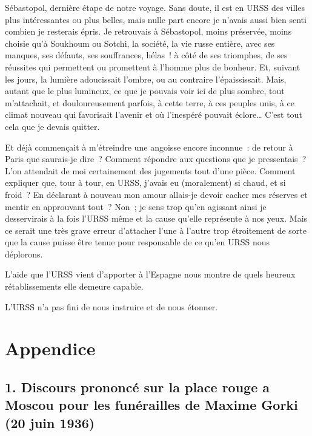 \documentclass[french,twoside]{book} %
\newcommand{\astermono}{\medskip\centerline{\color{rubric}\large\selectfont{\syms ✻}}\medskip\par}%
\newcommand\chapteropen{} %
\newcommand\chaptercont{} %
\newcommand\chapterclose{} %
\begin{document}
\chaptercont
\noindent Sébastopol, dernière étape de notre voyage. Sans doute, il est en URSS des villes plus intéressantes ou plus belles, mais nulle part encore je n’avais aussi bien senti combien je resterais épris. Je retrouvais à Sébastopol, moins préservée, moins choisie qu’à Soukhoum ou Sotchi, la société, la vie russe entière, avec ses manques, ses défauts, ses souffrances, hélas ! à côté de ses triomphes, de ses réussites qui permettent ou promettent à l’homme plus de bonheur. Et, suivant les jours, la lumière adoucissait l’ombre, ou au contraire l’épaississait. Mais, autant que le plus lumineux, ce que je pouvais voir ici de plus sombre, tout m’attachait, et douloureusement parfois, à cette terre, à ces peuples unis, à ce climat nouveau qui favorisait l’avenir et où l’inespéré pouvait éclore… C’est tout cela que je devais quitter.\par
Et déjà commençait à m’étreindre une angoisse encore inconnue : de retour à Paris que saurais-je dire ? Comment répondre aux questions que je pressentais ? L’on attendait de moi certainement des jugements tout d’une pièce. Comment expliquer que, tour à tour, en URSS, j’avais eu (moralement) si chaud, et si froid ? En déclarant à nouveau mon amour allais-je devoir cacher mes réserves et mentir en approuvant tout ? Non ; je sens trop qu’en agissant ainsi je desservirais à la fois l’URSS même et la cause qu’elle représente à nos yeux. Mais ce serait une très grave erreur d’attacher l’une à l’autre trop étroitement de sorte que la cause puisse être tenue pour responsable de ce qu’en URSS nous déplorons.\par

\astermono

\noindent L’aide que l’URSS vient d’apporter à l’Espagne nous montre de quels heureux rétablissements elle demeure capable.\par
L’URSS n’a pas fini de nous instruire et de nous étonner.
\chapterclose


\chapteropen

\chapter[{Appendice}]{Appendice}
\renewcommand{\leftmark}{Appendice}


\chaptercont

\section[{1. Discours prononcé sur la place rouge a Moscou pour les funérailles de Maxime Gorki (20 juin 1936)}]{1. Discours prononcé sur la place rouge a Moscou pour les funérailles de Maxime Gorki (20 juin 1936)}
\end{document}
